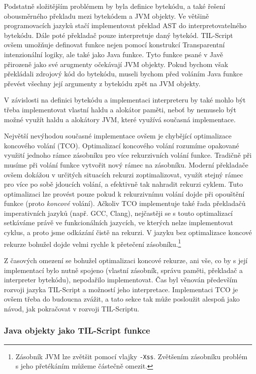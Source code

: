 Podstatně složitějším problémem by byla definice bytekódu, a také řešení obousměrného překladu mezi
bytekódem a JVM objekty. Ve většině programovacích jazyků stačí implementovat překlad AST
do interpretovatelného bytekódu. Dále poté překladač pouze interpretuje daný bytekód. TIL-Script
ovšem umožňuje definovat funkce nejen pomocí konstrukcí Transparentní intenzionální logiky, ale také
jako Java funkce. Tyto funkce psané v Javě přirozeně jako své arugmenty očekávají JVM objekty.
Pokud bychom však překládali zdrojový kód do bytekódu, museli bychom před voláním Java funkce
převést všechny její argumenty z bytekódu zpět na JVM objekty.

V závislosti na definici bytekódu a implementaci interpreteru by také mohlo být třeba implementovat
vlastní haldu a alokátor paměti, neboť by nemuselo být možné využít haldu a alokátory JVM, které
využívá současná implementace.

Největší nevýhodou současné implementace ovšem je chybějící optimalizace koncového volání (TCO).
Optimalizací koncového volání rozumíme opakované využití jednoho rámce zásobníku pro více
rekurzivních volání funkce. Tradičně při musíme při volání funkce vytvořit nový rámec na zásobníku.
Moderní překladače ovšem dokážou v určitých situacích rekurzi zoptimalizovat, využít stejný rámec
pro více po sobě jdoucích volání, a efektivně tak nahradit rekurzi cyklem. Tuto optimalizaci lze
provést pouze pokud k rekurzivnímu volání dojde při opouštění funkce (proto \textit{koncové}
volání). Ačkoliv TCO implementuje také řada překladačů imperativních jazyků (např. GCC, Clang),
nejčastěji se s touto optimalizací setkáváme právě ve funkcionálních jazycích, ve kterých nelze
implementovat cyklus, a proto jsme odkázání čistě na rekurzi. V jazyku bez optimalizace koncové
rekurze bohužel dojde velmi rychle k přetečení zásobníku.\footnote{
  Zásobník JVM lze zvětšit pomocí vlajky \lstinline{-Xss}. Zvětšením zásobníku problém s jeho
  přetékáním můžeme částečně omezit.
}

Z časových omezení se bohužel optimalizaci koncové rekurze, ani vše, co by s její implementací bylo
nutně spojeno (vlastní zásobník, správu paměti, překladač a interpreter bytekódu), nepodařilo
implementovat. Čas byl věnován především rozvoji jazyka TIL-Script a možností jeho interpretace.
Implementaci TCO je ovšem třeba do budoucna zvážit, a tato sekce tak může posloužit alespoň jako
návod, jak pokračovat v rozvoji TIL-Scriptu.

\subsubsection{Java objekty jako TIL-Script funkce}

